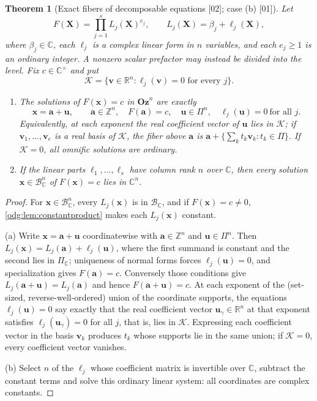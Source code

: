 \documentclass[11pt,oneside]{article}
\numberwithin{equation}{section}
\newtheorem{theorem}{Theorem}[section]
\theoremstyle{definition}
\theoremstyle{remark}
\newcommand{\Oz}{\mathbf{Oz}}
\newcommand{\Z}{\mathbb Z}
\newcommand{\R}{\mathbb R}
\newcommand{\C}{\mathbb C}
\newcommand{\BC}{\mathcal B_{\C}}
\newcommand{\src}[1]{\textup{\textsf{\small[#1]}}}
\begin{document}
\begin{theorem}[Exact fibers of decomposable equations \src{02}; case (b) \src{01}]\label{odg:thm:decomposable}
Let
\[
 F(\mathbf X)=\prod_{j=1}^{s}L_j(\mathbf X)^{e_j},\qquad
 L_j(\mathbf X)=\beta_j+\ell_j(\mathbf X),
\]
where $\beta_j\in\C$, each $\ell_j$ is a complex linear form in
$n$ variables, and each $e_j\ge1$ is an ordinary integer. A nonzero scalar
prefactor may instead be divided into the level. Fix $c\in\C^\times$ and put
\[
 \mathcal K=\{\mathbf v\in\R^n:\ell_j(\mathbf v)=0\text{ for every }j\}.
\]
\begin{enumerate}[label=\textup{(\alph*)},leftmargin=*]
\item The solutions of $F(\mathbf x)=c$ in $\Oz^n$ are exactly
\begin{equation}\label{odg:eq:decomposablefiber}
 \mathbf x=\mathbf a+\mathbf u,\qquad \mathbf a\in\Z^n,
 \quad F(\mathbf a)=c,
 \quad \mathbf u\in\Pi^n,
 \quad \ell_j(\mathbf u)=0\ \text{for all }j.
\end{equation}
Equivalently, at each exponent the real coefficient vector of $\mathbf u$
lies in $\mathcal K$; if $\mathbf v_1,\ldots,\mathbf v_e$ is a real basis of
$\mathcal K$, the fiber above $\mathbf a$ is
$\mathbf a+\{\sum_k t_k\mathbf v_k:t_k\in\Pi\}$. If $\mathcal K=0$, all
omnific solutions are ordinary.
\item If the linear parts $\ell_1,\ldots,\ell_s$ have column rank $n$ over
$\C$, then every solution $\mathbf x\in\BC^n$ of $F(\mathbf x)=c$ lies in
$\C^n$.
\end{enumerate}
\end{theorem}
\begin{proof}
For $\mathbf x\in\BC^n$, every $L_j(\mathbf x)$ is in $\BC$, and if
$F(\mathbf x)=c\ne0$, \cref{odg:lem:constantproduct} makes each
$L_j(\mathbf x)$ constant.

(a) Write $\mathbf x=\mathbf a+\mathbf u$ coordinatewise with
$\mathbf a\in\Z^n$ and $\mathbf u\in\Pi^n$. Then
$L_j(\mathbf x)=L_j(\mathbf a)+\ell_j(\mathbf u)$, where the first summand is
constant and the second lies in $\Pi_{\C}$; uniqueness of normal forms
forces $\ell_j(\mathbf u)=0$, and specialization gives $F(\mathbf a)=c$.
Conversely those conditions give $L_j(\mathbf a+\mathbf u)=L_j(\mathbf a)$ and
hence $F(\mathbf a+\mathbf u)=c$. At each exponent of the (set-sized,
reverse-well-ordered) union of the coordinate supports, the equations
$\ell_j(\mathbf u)=0$ say exactly that the real coefficient vector
$\mathbf u_\gamma\in\R^n$ at that exponent satisfies $\ell_j(\mathbf u_\gamma)=0$
for all $j$, that is, lies in $\mathcal K$. Expressing each coefficient vector in the basis
$\mathbf v_k$ produces $t_k$ whose supports lie in the same union; if
$\mathcal K=0$, every coefficient vector vanishes.

(b) Select $n$ of the $\ell_j$ whose coefficient matrix is invertible over
$\C$, subtract the constant terms and solve this ordinary linear system:
all coordinates are complex constants.
\end{proof}
\end{document}

